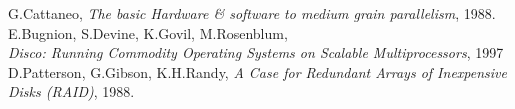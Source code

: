 \begin{thebibliography}{9}
  G.Cattaneo, \textit{The basic Hardware \& software to medium grain parallelism}, 1988.
  E.Bugnion, S.Devine, K.Govil, M.Rosenblum, \\ \textit{Disco: Running Commodity Operating Systems on Scalable Multiprocessors}, 1997
  D.Patterson, G.Gibson, K.H.Randy, \textit{A Case for Redundant Arrays of Inexpensive Disks (RAID)}, 1988.
\end{thebibliography}
